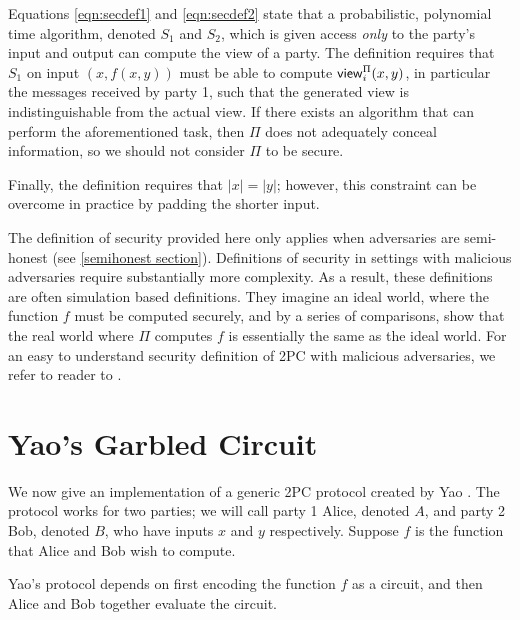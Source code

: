 \begin{description}
Equations \ref{eqn:secdef1} and \ref{eqn:secdef2} state that a probabilistic, polynomial time algorithm, denoted $S_1$ and $S_2$, which is given access \textit{only} to the party's input and output can compute the view of a party.
The definition requires that $S_1$ on input $(x, f(x,y))$ must be able to compute ${\sf view}^{\Pi}_i(x,y)$, in particular the messages received by party 1, such that the generated view is indistinguishable from the actual view.
If there exists an algorithm that can perform the aforementioned task, then $\Pi$ does not adequately conceal information, so we should not consider $\Pi$ to be secure.

Finally, the definition requires that $|x| = |y|$; however, this constraint can be overcome in practice by padding the shorter input.
\end{description}

The definition of security provided here only applies when adversaries are semi-honest (see \ref{semihonest section}).
Definitions of security in settings with malicious adversaries require substantially more complexity.
As a result, these definitions are often simulation based definitions.
They imagine an ideal world, where the function $f$ must be computed securely, and by a series of comparisons, show that the real world where $\Pi$ computes $f$ is essentially the same as the ideal world.
For an easy to understand security definition of 2PC with malicious adversaries, we refer to reader to \cite{lindell2009}.

\section{Yao's Garbled Circuit}
We now give an implementation of a generic 2PC protocol created by Yao \cite{yao}.
The protocol works for two parties; we will call party 1 Alice, denoted $A$, and party 2 Bob, denoted $B$, who have inputs $x$ and $y$ respectively.
Suppose $f$ is the function that Alice and Bob wish to compute.

Yao's protocol depends on first encoding the function $f$ as a circuit, and then Alice and Bob together evaluate the circuit.


